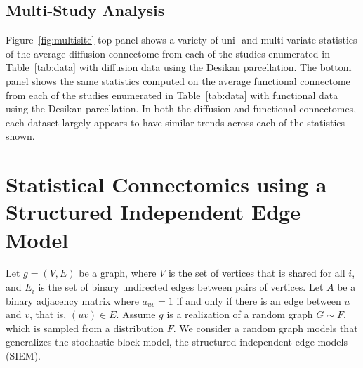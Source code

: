 \documentclass[11pt]{article}
\begin{document}


\subsection{Multi-Study Analysis}

Figure~\ref{fig:multisite} top panel shows a variety of uni- and multi-variate statistics of the average diffusion connectome from each of the studies enumerated in Table~\ref{tab:data} with diffusion data using the Desikan parcellation. The bottom panel shows the same statistics computed on the average functional connectome from each of the studies enumerated in Table~\ref{tab:data} with functional data using the Desikan parcellation. In both the diffusion and functional connectomes, each dataset largely appears to have similar trends across each of the statistics shown.




\section{Statistical Connectomics using a Structured Independent Edge Model}
\label{app:siem}

Let $g=(V,E)$ be a graph, where $V$ is the set of vertices that is shared for all $i$, and $E_i$ is the set of binary undirected edges between pairs of vertices.  Let $A$ be a binary adjacency matrix where $a_{uv}=1$ if and only if there is an edge between $u$ and $v$, that is, $(uv) \in E$. 
Assume $g$ is a realization of a random graph $G \sim F$, which is sampled from a distribution $F$.  
We consider a random graph models that generalizes the stochastic block model, the structured independent edge models (SIEM).  
\end{document}
